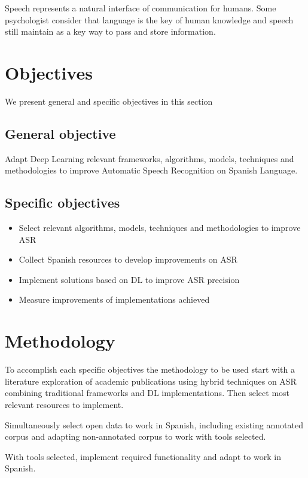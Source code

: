 Speech represents a natural interface of communication for humans. Some psychologist consider that language is the key of human knowledge \cite{QOUTE REQUIRED} and speech still maintain as a key way to pass and store information.

\section{Objectives}

We present general and specific objectives in this section

\subsection{General objective}

Adapt Deep Learning relevant frameworks, algorithms, models, techniques and methodologies to improve Automatic Speech Recognition on Spanish Language.

\subsection{Specific objectives}

\begin{itemize}
    \item Select relevant algorithms, models, techniques and methodologies to improve ASR
    \item Collect Spanish resources to develop improvements on ASR
    \item Implement solutions based on DL to improve ASR precision
    \item Measure improvements of implementations achieved
\end{itemize}

\section{Methodology}

To accomplish each specific objectives the methodology  to be used start with a literature exploration of academic publications using hybrid techniques on ASR combining traditional frameworks and DL implementations. Then select most relevant resources to implement.

Simultaneously select open data to work in Spanish, including existing annotated corpus and adapting non-annotated corpus to work with tools selected.

With tools selected, implement required functionality and adapt to work in Spanish.

